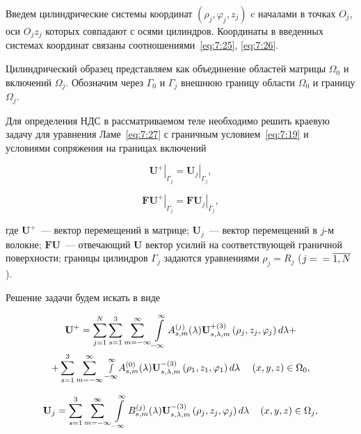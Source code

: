 Введем цилиндрические системы координат $(\rho_j,\varphi_j,z_j)$ c началами в точках $O_j$, оси $O_jz_j$ которых совпадают с осями цилиндров. Координаты в введенных системах координат связаны соотношениями~\eqref{eq:7:25}, \eqref{eq:7:26}.

Цилиндрический образец представляем как объединение областей матрицы $\Omega_0$ и включений $\Omega_j$. Обозначим через $\Gamma_0$ и $\Gamma_j$ внешнюю границу области $\Omega_0$ и границу $\Omega_j$.

Для определения НДС в рассматриваемом теле необходимо решить краевую задачу для уравнения Ламе~\eqref{eq:7:27} с граничным условием~\eqref{eq:7:19} и условиями сопряжения на границах включений

\begin{equation}
\left.\mathbf{U}^+\right|_{\Gamma_j}=\left.\mathbf{U}_j\right|_{\Gamma_j},
\label{eq:7:33}
\end{equation}

\begin{equation}
\left.\mathbf{FU}^+\right|_{\Gamma_j}=\left.\mathbf{FU}_j\right|_{\Gamma_j},
\label{eq:7:34}
\end{equation}

\noindent где $\mathbf{U}^+$~--- вектор перемещений в матрице; $\mathbf{U}_j$~--- вектор перемещений в $j$-м волокне; $\mathbf{FU}$~--- отвечающий $\mathbf{U}$ вектор усилий на соответствующей граничной поверхности; границы цилиндров $\Gamma_j$ задаются уравнениями $\rho_j=R_j$ ($j=\\=\overline{1,N}$).\par\sloppy

Решение задачи будем искать в виде

\begin{multline}
{{\bf{U}}^ + } = \sum\limits_{j = 1}^N {\sum\limits_{s = 1}^3 {\sum\limits_{m =  - \infty }^\infty  {\int\limits_{ - \infty }^\infty  {A_{s,m}^{(j)}} } } } (\lambda ){\bf{U}}_{s,\lambda ,m}^{ + (3)}\left( {{\rho _j},{z_j},{\varphi _j}} \right)d\lambda  + \\
+ \sum\limits_{s = 1}^3 {\sum\limits_{m =  - \infty }^\infty  {\mathop \smallint \limits_{ - \infty }^\infty  } } A_{s,m}^{(0)}(\lambda ){\bf{U}}_{s,\lambda ,m}^{ - (3)}\left( {{\rho _1},{z_1},{\varphi _1}} \right)d\lambda \;\;\;{\mkern 1mu} {\kern 1pt} {\kern 1pt} \left( {x,y,z} \right) \in {\Omega _0},
\end{multline}

\begin{equation}
{{\bf{U}}_j} = \sum\limits_{s = 1}^3 {\sum\limits_{m =  - \infty }^\infty  {\int\limits_{ - \infty }^\infty  {B_{s,m}^{(j)}} } } (\lambda ){\bf{U}}_{s,\lambda ,m}^{ - (3)}\left( {{\rho _j},{z_j},{\varphi _j}} \right)d\lambda \;\;\;{\mkern 1mu} {\kern 1pt} \left( {x,y,z} \right) \in {\Omega _j},
\end{equation}

